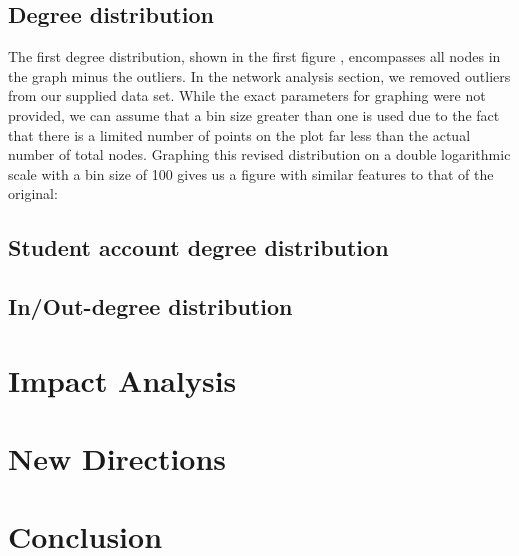 \documentclass[a4paper]{article}
\begin{document}
\begin{multicols}{2}
\subsection{Degree distribution}
\hspace*{\parindent}The first degree distribution, shown in the first figure \cite{1}, encompasses all nodes in the graph minus the outliers. In the network analysis section, we removed outliers from our supplied data set. While the exact parameters for graphing were not provided, we can assume that a bin size greater than one is used due to the fact that there is a limited number of points on the plot far less than the actual number of total nodes. Graphing this revised distribution on a double logarithmic scale with a bin size of 100 gives us a figure with similar features to that of the original:

\subsection{Student account degree distribution}
\hspace*{\parindent}

\subsection{In/Out-degree distribution}
\hspace*{\parindent}


\section{Impact Analysis}
\hspace*{\parindent}\cite{4}\cite{5}	

\section{New Directions}
\hspace*{\parindent}

\section{Conclusion}
\hspace*{\parindent}

\end{multicols}

\newpage
\printbibliography %
\end{document}
